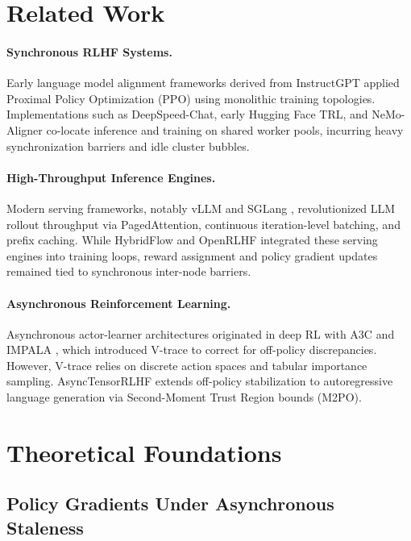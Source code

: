 \documentclass[10pt,twocolumn,letterpaper]{article}
\begin{document}
\section{Related Work}

\paragraph{Synchronous RLHF Systems.} Early language model alignment frameworks derived from InstructGPT \cite{ouyang2022training} applied Proximal Policy Optimization (PPO) \cite{schulman2017proximal} using monolithic training topologies. Implementations such as DeepSpeed-Chat, early Hugging Face TRL, and NeMo-Aligner co-locate inference and training on shared worker pools, incurring heavy synchronization barriers and idle cluster bubbles.

\paragraph{High-Throughput Inference Engines.} Modern serving frameworks, notably vLLM \cite{kwon2023efficient} and SGLang \cite{zheng2023sglang}, revolutionized LLM rollout throughput via PagedAttention, continuous iteration-level batching, and prefix caching. While HybridFlow \cite{sheng2024hybridflow} and OpenRLHF integrated these serving engines into training loops, reward assignment and policy gradient updates remained tied to synchronous inter-node barriers.

\paragraph{Asynchronous Reinforcement Learning.} Asynchronous actor-learner architectures originated in deep RL with A3C \cite{mnih2016asynchronous} and IMPALA \cite{espeholt2018impala}, which introduced V-trace to correct for off-policy discrepancies. However, V-trace relies on discrete action spaces and tabular importance sampling. AsyncTensorRLHF extends off-policy stabilization to autoregressive language generation via Second-Moment Trust Region bounds (M2PO).

\section{Theoretical Foundations}

\subsection{Policy Gradients Under Asynchronous Staleness}
\end{document}
